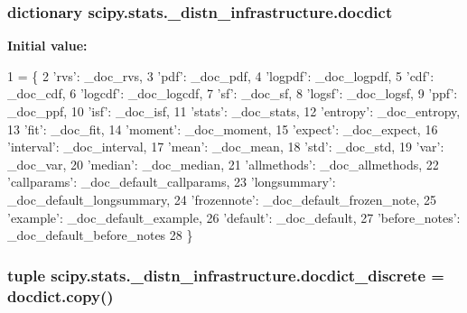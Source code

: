 \subsubsection[{docdict}]{\setlength{\rightskip}{0pt plus 5cm}dictionary scipy.\+stats.\+\_\+distn\+\_\+infrastructure.\+docdict}\label{namespacescipy_1_1stats_1_1__distn__infrastructure_ab5f494257a7587d165ec243a92b90b57}
{\bfseries Initial value\+:}
\begin{DoxyCode}
1 = \{
2     \textcolor{stringliteral}{'rvs'}: \_doc\_rvs,
3     \textcolor{stringliteral}{'pdf'}: \_doc\_pdf,
4     \textcolor{stringliteral}{'logpdf'}: \_doc\_logpdf,
5     \textcolor{stringliteral}{'cdf'}: \_doc\_cdf,
6     \textcolor{stringliteral}{'logcdf'}: \_doc\_logcdf,
7     \textcolor{stringliteral}{'sf'}: \_doc\_sf,
8     \textcolor{stringliteral}{'logsf'}: \_doc\_logsf,
9     \textcolor{stringliteral}{'ppf'}: \_doc\_ppf,
10     \textcolor{stringliteral}{'isf'}: \_doc\_isf,
11     \textcolor{stringliteral}{'stats'}: \_doc\_stats,
12     \textcolor{stringliteral}{'entropy'}: \_doc\_entropy,
13     \textcolor{stringliteral}{'fit'}: \_doc\_fit,
14     \textcolor{stringliteral}{'moment'}: \_doc\_moment,
15     \textcolor{stringliteral}{'expect'}: \_doc\_expect,
16     \textcolor{stringliteral}{'interval'}: \_doc\_interval,
17     \textcolor{stringliteral}{'mean'}: \_doc\_mean,
18     \textcolor{stringliteral}{'std'}: \_doc\_std,
19     \textcolor{stringliteral}{'var'}: \_doc\_var,
20     \textcolor{stringliteral}{'median'}: \_doc\_median,
21     \textcolor{stringliteral}{'allmethods'}: \_doc\_allmethods,
22     \textcolor{stringliteral}{'callparams'}: \_doc\_default\_callparams,
23     \textcolor{stringliteral}{'longsummary'}: \_doc\_default\_longsummary,
24     \textcolor{stringliteral}{'frozennote'}: \_doc\_default\_frozen\_note,
25     \textcolor{stringliteral}{'example'}: \_doc\_default\_example,
26     \textcolor{stringliteral}{'default'}: \_doc\_default,
27     \textcolor{stringliteral}{'before\_notes'}: \_doc\_default\_before\_notes
28 \}
\end{DoxyCode}
\hypertarget{namespacescipy_1_1stats_1_1__distn__infrastructure_a179151589849d5de65cb01f9c2a45856}{}
\subsubsection[{docdict\+\_\+discrete}]{\setlength{\rightskip}{0pt plus 5cm}tuple scipy.\+stats.\+\_\+distn\+\_\+infrastructure.\+docdict\+\_\+discrete = docdict.\+copy()}\label{namespacescipy_1_1stats_1_1__distn__infrastructure_a179151589849d5de65cb01f9c2a45856}
\hypertarget{namespacescipy_1_1stats_1_1__distn__infrastructure_aec447665e9947010e795781f414be00e}{}
